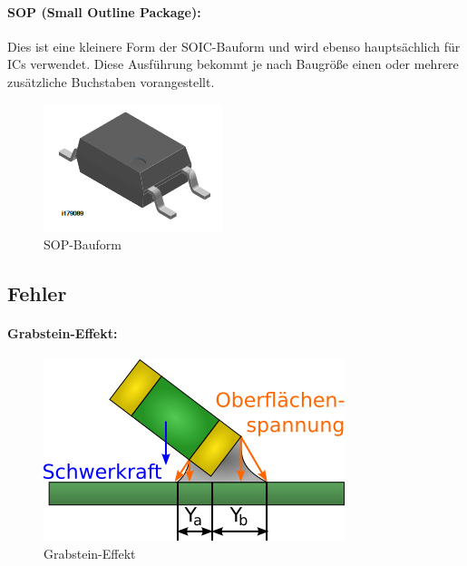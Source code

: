 \paragraph{SOP (Small Outline Package):}
Dies ist eine kleinere Form der SOIC-Bauform und wird ebenso hauptsächlich für ICs verwendet. Diese Ausführung bekommt je nach Baugröße einen oder mehrere zusätzliche Buchstaben vorangestellt.
\begin{figure}[H]
	\centering
	\includegraphics{images/technische_grundlagen/sop.png}
	\caption{SOP-Bauform \cite[vgl.][]{vishay-sop}}
\end{figure}

\subsection{Fehler}
\paragraph{Grabstein-Effekt:} %
\begin{figure}[H]
	\centering
	\includegraphics[width=.5\linewidth]{images/technische_grundlagen/grabsteinEffekt.png}%
	\caption{Grabstein-Effekt}
\end{figure}


